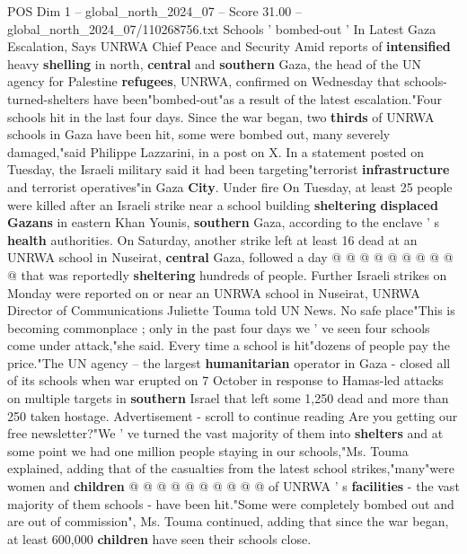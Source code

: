 \begin{textsample}{POS Dim 1 – global\_north\_2024\_07 – Score 31.00 – global\_north\_2024\_07/110268756.txt}  \label{ex:f1_pos_388}
Schools ' bombed-out ' In Latest Gaza Escalation, Says UNRWA Chief Peace and Security Amid reports of \textbf{intensified} heavy \textbf{shelling} in north, \textbf{central} and \textbf{southern} Gaza, the head of the UN agency for Palestine \textbf{refugees}, UNRWA, confirmed on Wednesday that schools-turned-shelters have been"bombed-out"as a result of the latest escalation."Four schools hit in the last four days.
Since the war began, two \textbf{thirds} of UNRWA schools in Gaza have been hit, some were bombed out, many severely damaged,"said Philippe Lazzarini, in a post on X.
In a statement posted on Tuesday, the Israeli military said it had been targeting"terrorist \textbf{infrastructure} and terrorist operatives"in Gaza \textbf{City}.
Under fire On Tuesday, at least 25 people were killed after an Israeli strike near a school building \textbf{sheltering} \textbf{displaced} \textbf{Gazans} in eastern Khan Younis, \textbf{southern} Gaza, according to the enclave ' s \textbf{health} authorities.
On Saturday, another strike left at least 16 dead at an UNRWA school in Nuseirat, \textbf{central} Gaza, followed a day @ @ @ @ @ @ @ @ @ @ that was reportedly \textbf{sheltering} hundreds of people.
Further Israeli strikes on Monday were reported on or near an UNRWA school in Nuseirat, UNRWA Director of Communications Juliette Touma told UN News.
No safe place"This is becoming commonplace ; only in the past four days we ' ve seen four schools come under attack,"she said.
Every time a school is hit"dozens of people pay the price."The UN agency -- the largest \textbf{humanitarian} operator in Gaza - closed all of its schools when war erupted on 7 October in response to Hamas-led attacks on multiple targets in \textbf{southern} Israel that left some 1,250 dead and more than 250 taken hostage.
Advertisement - scroll to continue reading Are you getting our free newsletter?"We ' ve turned the vast majority of them into \textbf{shelters} and at some point we had one million people staying in our schools,"Ms.
Touma explained, adding that of the casualties from the latest school strikes,"many"were women and \textbf{children} @ @ @ @ @ @ @ @ @ @ of UNRWA ' s \textbf{facilities} - the vast majority of them schools - have been hit."Some were completely bombed out and are out of commission", Ms.
Touma continued, adding that since the war began, at least 600,000 \textbf{children} have seen their schools close.

\end{textsample}
